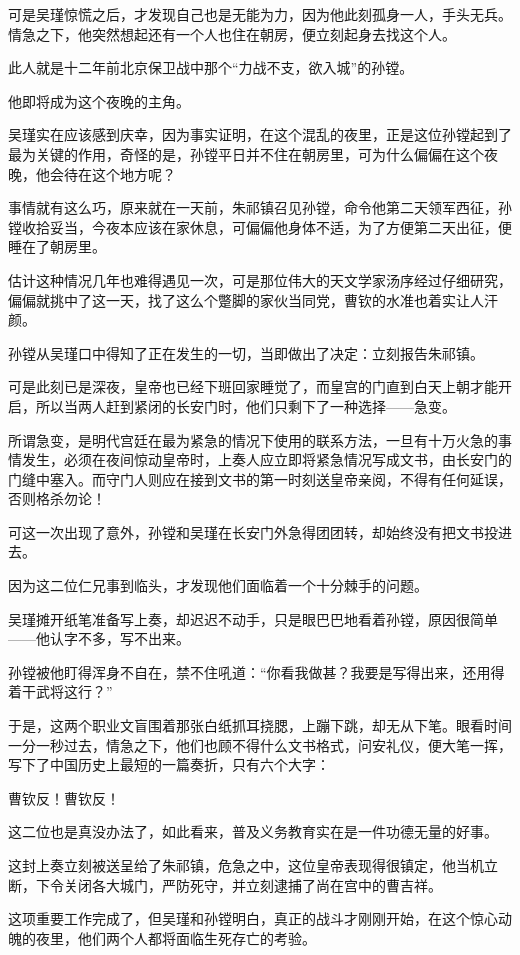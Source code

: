 \begin{multicols}{\theparacolNo}
可是吴瑾惊慌之后，才发现自己也是无能为力，因为他此刻孤身一人，手头无兵。情急之下，他突然想起还有一个人也住在朝房，便立刻起身去找这个人。

此人就是十二年前北京保卫战中那个“力战不支，欲入城”的孙镗。

他即将成为这个夜晚的主角。

吴瑾实在应该感到庆幸，因为事实证明，在这个混乱的夜里，正是这位孙镗起到了最为关键的作用，奇怪的是，孙镗平日并不住在朝房里，可为什么偏偏在这个夜晚，他会待在这个地方呢？

事情就有这么巧，原来就在一天前，朱祁镇召见孙镗，命令他第二天领军西征，孙镗收拾妥当，今夜本应该在家休息，可偏偏他身体不适，为了方便第二天出征，便睡在了朝房里。

估计这种情况几年也难得遇见一次，可是那位伟大的天文学家汤序经过仔细研究，偏偏就挑中了这一天，找了这么个蹩脚的家伙当同党，曹钦的水准也着实让人汗颜。

孙镗从吴瑾口中得知了正在发生的一切，当即做出了决定：立刻报告朱祁镇。

可是此刻已是深夜，皇帝也已经下班回家睡觉了，而皇宫的门直到白天上朝才能开启，所以当两人赶到紧闭的长安门时，他们只剩下了一种选择——急变。

所谓急变，是明代宫廷在最为紧急的情况下使用的联系方法，一旦有十万火急的事情发生，必须在夜间惊动皇帝时，上奏人应立即将紧急情况写成文书，由长安门的门缝中塞入。而守门人则应在接到文书的第一时刻送皇帝亲阅，不得有任何延误，否则格杀勿论！

可这一次出现了意外，孙镗和吴瑾在长安门外急得团团转，却始终没有把文书投进去。

因为这二位仁兄事到临头，才发现他们面临着一个十分棘手的问题。

吴瑾摊开纸笔准备写上奏，却迟迟不动手，只是眼巴巴地看着孙镗，原因很简单——他认字不多，写不出来。

孙镗被他盯得浑身不自在，禁不住吼道：“你看我做甚？我要是写得出来，还用得着干武将这行？”

于是，这两个职业文盲围着那张白纸抓耳挠腮，上蹦下跳，却无从下笔。眼看时间一分一秒过去，情急之下，他们也顾不得什么文书格式，问安礼仪，便大笔一挥，写下了中国历史上最短的一篇奏折，只有六个大字：

曹钦反！曹钦反！

这二位也是真没办法了，如此看来，普及义务教育实在是一件功德无量的好事。

这封上奏立刻被送呈给了朱祁镇，危急之中，这位皇帝表现得很镇定，他当机立断，下令关闭各大城门，严防死守，并立刻逮捕了尚在宫中的曹吉祥。

这项重要工作完成了，但吴瑾和孙镗明白，真正的战斗才刚刚开始，在这个惊心动魄的夜里，他们两个人都将面临生死存亡的考验。


\end{multicols}
